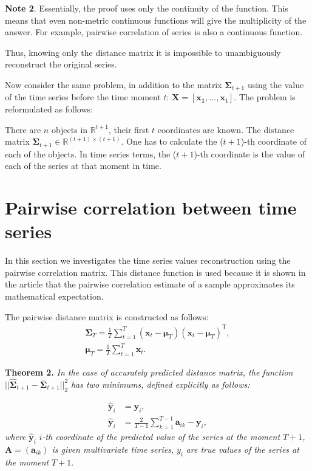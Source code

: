 \documentclass[12pt]{article}
\begin{document}
\textbf{Note 2}. Essentially, the proof uses only the continuity of the function. This means that even non-metric continuous functions will give the multiplicity of the answer. For example, pairwise correlation of series is also a continuous function.

Thus, knowing only the distance matrix it is impossible to unambiguously reconstruct the original series.

Now consider the same problem, in addition to the matrix $\mathbf{\Sigma}_{t+1}$ using the value of the time series before the time moment $t$: $\mathbf{X}=[\mathbf{x_1}, \ldots, \mathbf{x_{t}}]$. The problem is reformulated as follows:

There are $n$ objects in $\mathbb{R}^{t+1}$, their first $t$ coordinates are known. The distance matrix $\mathbf{\Sigma}_{t+1} \in \mathbb{R}^{(t+1) \times (t+1)}$. One has to calculate the ($t+1$)-th coordinate of each of the objects. In time series terms, the ($t+1$)-th coordinate is the value of each of the series at that moment in time.

\section{Pairwise correlation between time series}

In this section we investigates the time series values reconstruction using the pairwise correlation matrix. This distance function is used because it is shown in the article \cite{puchkin2023sharper} that the pairwise correlation estimate of a sample approximates its mathematical expectation.

The pairwise distance matrix is constructed as follows:
\begin{gather*}
	{\mathbf{\Sigma}}_T = \frac{1}{T} \sum_{t=1}^{T} (\mathbf{x}_t - \boldsymbol{\mu}_T)(\mathbf{x}_t - \boldsymbol{\mu}_T)^\mathsf{T},\\
	\boldsymbol{\mu}_T = \frac{1}{T} \sum_{t=1}^{T} \mathbf{x}_t.
\end{gather*}

\textbf{Theorem 2.} \emph{In the case of accurately predicted distance matrix, the function} $||\hat{\mathbf{\Sigma}}_{t+1} - \bar{\mathbf{\Sigma}}_{t+1}||_2^2$ \emph{has two minimums, defined explicitly as follows:}

\begin{align*}
	\hat{\mathbf{y}}_i &= \mathbf{y}_i,\\
	\hat{\mathbf{y}}_i &= \frac{2}{T-1} \sum_{k=1}^{T-1} \mathbf{a}_{ik} - \mathbf{y}_i,
\end{align*}
\emph{where} $\hat{\mathbf{y}}_i$ $i$\emph{-th coordinate of the predicted value of the series at the moment $T+1$, $\mathbf{A}=(\mathbf{a}_{ik})$ is given multivariate time series,} $y_i$ \emph{are true values of the series at the moment} $T+1$.
\end{document}
